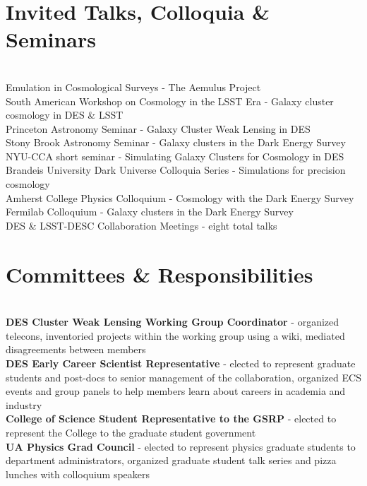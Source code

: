 \documentclass{res}
\begin{document}
\begin{resume}

\section{Invited Talks, Colloquia \& Seminars}
\vspace{-8pt}
\hrulefill\\
{ Emulation in Cosmological Surveys} - The Aemulus Project\\
{ South American Workshop on Cosmology in the LSST Era} - Galaxy cluster cosmology in DES \& LSST\\
Princeton Astronomy Seminar - Galaxy Cluster Weak Lensing in DES\\
{ Stony Brook Astronomy Seminar} - Galaxy clusters in the Dark Energy Survey\\
{ NYU-CCA short seminar} - Simulating Galaxy Clusters for Cosmology in DES\\
{ Brandeis University Dark Universe Colloquia Series} - Simulations for precision cosmology\\
{ Amherst College Physics Colloquium} - Cosmology with the Dark Energy Survey\\
{ Fermilab Colloquium} - Galaxy clusters in the Dark Energy Survey\\
DES \& LSST-DESC Collaboration Meetings - eight total talks

\section{Committees \& Responsibilities}
\vspace{-8pt}
\hrulefill\\
{\bf DES Cluster Weak Lensing Working Group Coordinator} - organized telecons, inventoried projects within the working group using a wiki, mediated disagreements between members\\
{\bf DES Early Career Scientist Representative} - elected to represent graduate students and post-docs to senior management of the collaboration, organized ECS events and group panels to help members learn about careers in academia and industry\\
{\bf College of Science Student Representative to the GSRP} - elected to represent the College to the graduate student government\\
{\bf UA Physics Grad Council} - elected to represent physics graduate students to department administrators, organized graduate student talk series and pizza lunches with colloquium speakers


\end{resume}
\end{document}
